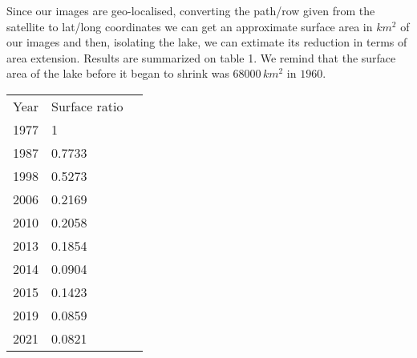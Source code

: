 Since our images are geo-localised, converting the path/row given from the satellite to lat/long coordinates we can get an approximate surface area in $km^2$ of our images and then, isolating the lake, we can extimate its reduction in terms of area extension. 
Results are summarized on table 1. We remind that the surface area of the lake before it began to shrink was $68000\,km^2$ in $1960$.  
\begin{table}[]
\begin{tabular}{|l|l|l}
\cline{1-2}
Year & Surface ratio &  \\ \cline{1-2}
1977 & 1             &  \\ \cline{1-2}
1987 & 0.7733        &  \\ \cline{1-2}
1998 & 0.5273        &  \\ \cline{1-2}
2006 & 0.2169        &  \\ \cline{1-2}
2010 & 0.2058        &  \\ \cline{1-2}
2013 & 0.1854        &  \\ \cline{1-2}
2014 & 0.0904        &  \\ \cline{1-2}
2015 & 0.1423        &  \\ \cline{1-2}
2019 & 0.0859        &  \\ \cline{1-2}
2021 & 0.0821        &  \\ \cline{1-2}
\end{tabular}
\end{table}
